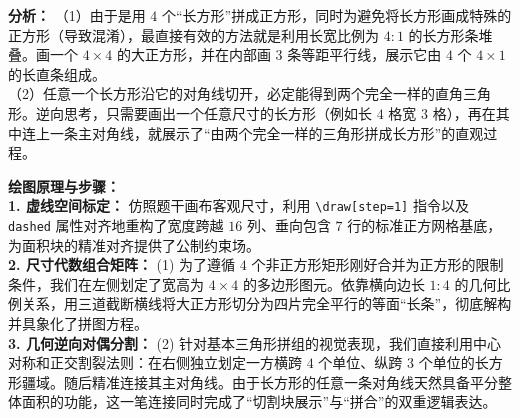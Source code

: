 \textbf{分析：}
（1）由于是用 $4$ 个“长方形”拼成正方形，同时为避免将长方形画成特殊的正方形（导致混淆），最直接有效的方法就是利用长宽比例为 $4:1$ 的长方形条堆叠。画一个 $4 \times 4$ 的大正方形，并在内部画 $3$ 条等距平行线，展示它由 $4$ 个 $4\times 1$ 的长直条组成。\\
（2）任意一个长方形沿它的对角线切开，必定能得到两个完全一样的直角三角形。逆向思考，只需要画出一个任意尺寸的长方形（例如长 $4$ 格宽 $3$ 格），再在其中连上一条主对角线，就展示了“由两个完全一样的三角形拼成长方形”的直观过程。

\vspace{0.6cm}
\begin{center}
\end{center}

\vspace{0.4cm}
{\small\color{blue!70!black}
\textbf{绘图原理与步骤：}\\
\textbf{1. 虚线空间标定：} 仿照题干画布客观尺寸，利用 \texttt{\textbackslash draw[step=1]} 指令以及 \texttt{dashed} 属性对齐地重构了宽度跨越 $16$ 列、垂向包含 $7$ 行的标准正方网格基底，为面积块的精准对齐提供了公制约束场。\\
\textbf{2. 尺寸代数组合矩阵：} (1) 为了遵循 $4$ 个非正方形矩形刚好合并为正方形的限制条件，我们在左侧划定了宽高为 $4 \times 4$ 的多边形图元。依靠横向边长 $1:4$ 的几何比例关系，用三道截断横线将大正方形切分为四片完全平行的等面“长条”，彻底解构并具象化了拼图方程。\\
\textbf{3. 几何逆向对偶分割：} (2) 针对基本三角形拼组的视觉表现，我们直接利用中心对称和正交割裂法则：在右侧独立划定一方横跨 $4$ 个单位、纵跨 $3$ 个单位的长方形疆域。随后精准连接其主对角线。由于长方形的任意一条对角线天然具备平分整体面积的功能，这一笔连接同时完成了“切割块展示”与“拼合”的双重逻辑表达。
}

\newpage
